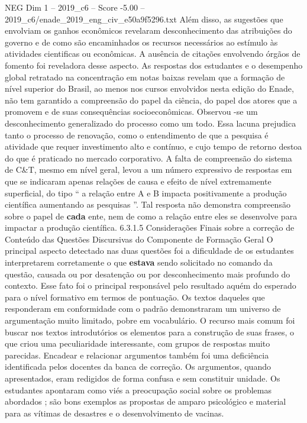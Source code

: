 \begin{textsample}{NEG Dim 1 – 2019\_c6 – Score -5.00 – 2019\_c6/enade\_2019\_eng\_civ\_e50a9f5296.txt}
Além disso, as sugestões que envolviam os ganhos econômicos revelaram desconhecimento das atribuições do governo e de como são encaminhados os recursos necessários ao estímulo às atividades cientificas ou econômicas.
A ausência de citações envolvendo órgãos de fomento foi reveladora desse aspecto.
As respostas dos estudantes e o desempenho global retratado na concentração em notas baixas revelam que a formação de nível superior do Brasil, ao menos nos cursos envolvidos nesta edição do Enade, não tem garantido a compreensão do papel da ciência, do papel dos atores que a promovem e de suas consequências socioeconômicas.
Observou -se um desconhecimento generalizado do processo como um todo.
Essa lacuna prejudica tanto o processo de renovação, como o entendimento de que a pesquisa é atividade que requer investimento alto e contínuo, e cujo tempo de retorno destoa do que é praticado no mercado corporativo.
A falta de compreensão do sistema de C\&T, mesmo em nível geral, levou a um número expressivo de respostas em que se indicaram apenas relações de causa e efeito de nível extremamente superficial, do tipo “ a relação entre A e B impacta positivamente a produção científica aumentando as pesquisas ”.
Tal resposta não demonstra compreensão sobre o papel de \textbf{cada} ente, nem de como a relação entre eles se desenvolve para impactar a produção científica. 6.3.1.5 Considerações Finais sobre a correção de Conteúdo das Questões Discursivas do Componente de Formação Geral O principal aspecto detectado nas duas questões foi a dificuldade de os estudantes interpretarem corretamente o que \textbf{estava} sendo solicitado no comando da questão, causada ou por desatenção ou por desconhecimento mais profundo do contexto.
Esse fato foi o principal responsável pelo resultado aquém do esperado para o nível formativo em termos de pontuação.
Os textos daqueles que responderam em conformidade com o padrão demonstraram um universo de argumentação muito limitado, pobre em vocabulário.
O recurso mais comum foi buscar nos textos introdutórios os elementos para a construção de suas frases, o que criou uma peculiaridade interessante, com grupos de respostas muito parecidas.
Encadear e relacionar argumentos também foi uma deficiência identificada pelos docentes da banca de correção.
Os argumentos, quando apresentados, eram redigidos de forma confusa e sem constituir unidade.
Os estudantes apontaram como viés a preocupação social sobre os problemas abordados ; são bons exemplos as propostas de amparo psicológico e material para as vítimas de desastres e o desenvolvimento de vacinas.

\end{textsample}
